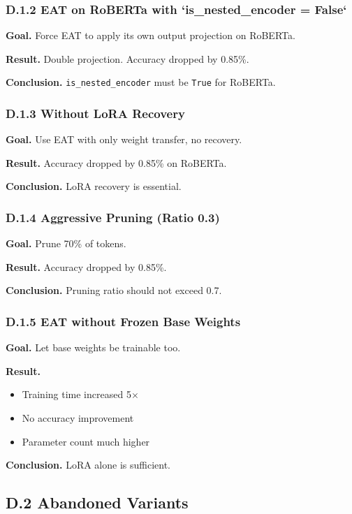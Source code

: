\subsubsection{D.1.2 EAT on RoBERTa with `is\_nested\_encoder = False`}

\textbf{Goal.} Force EAT to apply its own output projection on RoBERTa.

\textbf{Result.} Double projection. Accuracy dropped by 0.85\%.

\textbf{Conclusion.} \texttt{is\_nested\_encoder} must be \texttt{True} for RoBERTa.

\subsubsection{D.1.3 Without LoRA Recovery}

\textbf{Goal.} Use EAT with only weight transfer, no recovery.

\textbf{Result.} Accuracy dropped by 0.85\% on RoBERTa.

\textbf{Conclusion.} LoRA recovery is essential.

\subsubsection{D.1.4 Aggressive Pruning (Ratio 0.3)}

\textbf{Goal.} Prune 70\% of tokens.

\textbf{Result.} Accuracy dropped by 0.85\%.

\textbf{Conclusion.} Pruning ratio should not exceed 0.7.

\subsubsection{D.1.5 EAT without Frozen Base Weights}

\textbf{Goal.} Let base weights be trainable too.

\textbf{Result.} 
\begin{itemize}
\item Training time increased 5$\times$
\item No accuracy improvement
\item Parameter count much higher

\end{itemize}
\textbf{Conclusion.} LoRA alone is sufficient.

\subsection{D.2 Abandoned Variants}

